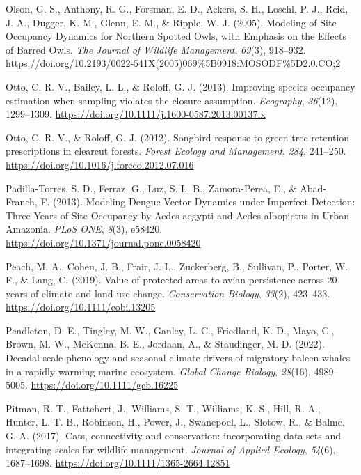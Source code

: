 \documentclass[
]{article}
\newlength{\cslhangindent}
\newenvironment{CSLReferences}[2] %
 {\begin{list}{}{%
  \setlength{\itemindent}{0pt}
  \setlength{\leftmargin}{0pt}
  \setlength{\parsep}{0pt}
  \ifodd #1
   \setlength{\leftmargin}{\cslhangindent}
   \setlength{\itemindent}{-1\cslhangindent}
  \fi
  \setlength{\itemsep}{#2\baselineskip}}}
 {\end{list}}
\begin{document}
\begin{CSLReferences}{1}{0}
Olson, G. S., Anthony, R. G., Forsman, E. D., Ackers, S. H., Loschl, P.
J., Reid, J. A., Dugger, K. M., Glenn, E. M., \& Ripple, W. J. (2005).
Modeling of Site Occupancy Dynamics for Northern Spotted Owls, with
Emphasis on the Effects of Barred Owls. \emph{The Journal of Wildlife
Management}, \emph{69}(3), 918--932.
\url{https://doi.org/10.2193/0022-541X(2005)069\%5B0918:MOSODF\%5D2.0.CO;2}

Otto, C. R. V., Bailey, L. L., \& Roloff, G. J. (2013). Improving
species occupancy estimation when sampling violates the closure
assumption. \emph{Ecography}, \emph{36}(12), 1299--1309.
\url{https://doi.org/10.1111/j.1600-0587.2013.00137.x}

Otto, C. R. V., \& Roloff, G. J. (2012). Songbird response to green-tree
retention prescriptions in clearcut forests. \emph{Forest Ecology and
Management}, \emph{284}, 241--250.
\url{https://doi.org/10.1016/j.foreco.2012.07.016}

Padilla-Torres, S. D., Ferraz, G., Luz, S. L. B., Zamora-Perea, E., \&
Abad-Franch, F. (2013). Modeling Dengue Vector Dynamics under Imperfect
Detection: Three Years of Site-Occupancy by Aedes aegypti and Aedes
albopictus in Urban Amazonia. \emph{PLoS ONE}, \emph{8}(3), e58420.
\url{https://doi.org/10.1371/journal.pone.0058420}

Peach, M. A., Cohen, J. B., Frair, J. L., Zuckerberg, B., Sullivan, P.,
Porter, W. F., \& Lang, C. (2019). Value of protected areas to avian
persistence across 20 years of climate and land{-}use change.
\emph{Conservation Biology}, \emph{33}(2), 423--433.
\url{https://doi.org/10.1111/cobi.13205}

Pendleton, D. E., Tingley, M. W., Ganley, L. C., Friedland, K. D., Mayo,
C., Brown, M. W., McKenna, B. E., Jordaan, A., \& Staudinger, M. D.
(2022). Decadal-scale phenology and seasonal climate drivers of
migratory baleen whales in a rapidly warming marine ecosystem.
\emph{Global Change Biology}, \emph{28}(16), 4989--5005.
\url{https://doi.org/10.1111/gcb.16225}

Pitman, R. T., Fattebert, J., Williams, S. T., Williams, K. S., Hill, R.
A., Hunter, L. T. B., Robinson, H., Power, J., Swanepoel, L., Slotow,
R., \& Balme, G. A. (2017). Cats, connectivity and conservation:
incorporating data sets and integrating scales for wildlife management.
\emph{Journal of Applied Ecology}, \emph{54}(6), 1687--1698.
\url{https://doi.org/10.1111/1365-2664.12851}


\end{CSLReferences}
\end{document}
